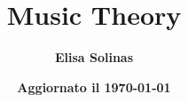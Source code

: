 \documentclass[oneside]{extbook}
\title{\Huge \textbf{Music Theory}}
\author{\Large \textbf{Elisa Solinas}}
\date{\textbf{Aggiornato il \today}}
\begin{document}
    \maketitle
    \dominitoc
    \tableofcontents
\end{document}
